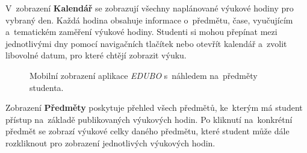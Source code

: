 \documentclass[male,czech,api_bc]{kitheses}
\begin{document}
\newpage

V~zobrazení \textbf{Kalendář} se zobrazují všechny naplánované výukové hodiny pro vybraný den. Každá hodina obsahuje informace o~předmětu, čase, vyučujícím a~tematickém zaměření výukové hodiny. Studenti si mohou přepínat mezi jednotlivými dny pomocí navigačních tlačítek nebo otevřít kalendář a~zvolit libovolné datum, pro které chtějí zobrazit výuku.

\begin{figure}[H]
	\centering
	\caption{Mobilní zobrazení aplikace \textit{EDUBO} s~náhledem na~předměty studenta.}
	\label{fig:edubo-6}
\end{figure}

Zobrazení \textbf{Předměty} poskytuje přehled všech předmětů, ke~kterým má student přístup na~základě publikovaných výukových hodin. Po kliknutí na~konkrétní předmět se zobrazí výukové celky daného předmětu, které student může dále rozkliknout pro zobrazení jednotlivých výukových hodin.
\end{document}
